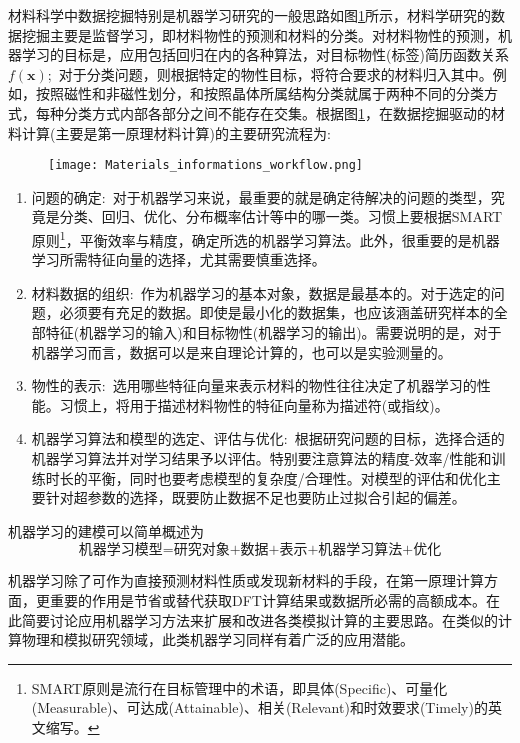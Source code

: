 材料科学中数据挖掘特别是机器学习研究的一般思路如图\ref{npjCM}所示，材料学研究的数据挖掘主要是监督学习，即材料物性的预测和材料的分类。对材料物性的预测，机器学习的目标是，应用包括回归在内的各种算法，对目标物性(标签)简历函数关系$f(\mathbf{x})$;~对于分类问题，则根据特定的物性目标，将符合要求的材料归入其中。例如，按照磁性和非磁性划分，和按照晶体所属结构分类就属于两种不同的分类方式，每种分类方式内部各部分之间不能存在交集。根据图\ref{npjCM}，在数据挖掘驱动的材料计算(主要是第一原理材料计算)的主要研究流程为:
\begin{figure}[h!]
\centering
\vspace*{-0.1in}
\texttt{[image: Materials\_informations\_workflow.png]}
\caption{\fontsize{7.2pt}{4.2pt}}%
\label{npjCM}
\end{figure}
\begin{enumerate}
	\item 问题的确定:~对于机器学习来说，最重要的就是确定待解决的问题的类型，究竟是分类、回归、优化、分布概率估计等中的哪一类。习惯上要根据\textrm{SMART}原则\footnote{\textrm{SMART}原则是流行在目标管理中的术语，即具体\textrm{(Specific)}、可量化\textrm{(Measurable)}、可达成\textrm{(Attainable)}、相关\textrm{(Relevant)}和时效要求\textrm{(Timely)}的英文缩写。}，平衡效率与精度，确定所选的机器学习算法。此外，很重要的是机器学习所需特征向量的选择，尤其需要慎重选择。
	\item 材料数据的组织:~作为机器学习的基本对象，数据是最基本的。对于选定的问题，必须要有充足的数据。即使是最小化的数据集，也应该涵盖研究样本的全部特征(机器学习的输入)和目标物性(机器学习的输出)。需要说明的是，对于机器学习而言，数据可以是来自理论计算的，也可以是实验测量的。
	\item 物性的表示:~选用哪些特征向量来表示材料的物性往往决定了机器学习的性能。习惯上，将用于描述材料物性的特征向量称为描述符\cite{PRL114-105503_2015}(或指纹)。
	\item 机器学习算法和模型的选定、评估与优化:~根据研究问题的目标，选择合适的机器学习算法并对学习结果予以评估。特别要注意算法的精度-效率/性能和训练时长的平衡，同时也要考虑模型的复杂度/合理性。对模型的评估和优化主要针对超参数的选择，既要防止数据不足也要防止过拟合引起的偏差。
\end{enumerate}
机器学习的建模可以简单概述为
\begin{displaymath}
	\mbox{机器学习模型=研究对象+数据+表示+机器学习算法+优化}
\end{displaymath}

机器学习除了可作为直接预测材料性质或发现新材料的手段，在第一原理计算方面，更重要的作用是节省或替代获取\textrm{DFT}计算结果或数据所必需的高额成本。在此简要讨论应用机器学习方法来扩展和改进各类模拟计算的主要思路。在类似的计算物理和模拟研究领域，此类机器学习同样有着广泛的应用潜能。

